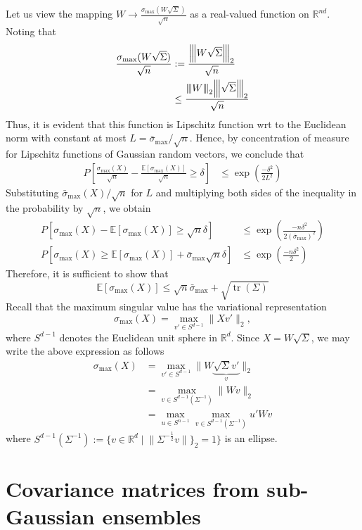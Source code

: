 \documentclass[10pt,handout,english]{beamer}
\DeclareMathOperator{\tr}{tr}
\newcommand{\E}{\mathbb{E}}
\newcommand{\R}{\mathbb{R}}
\newcommand{\vertiii}[1]{{\left\vert\kern-0.25ex\left\vert\kern-0.25ex\left\vert #1 
    \right\vert\kern-0.25ex\right\vert\kern-0.25ex\right\vert}}
\begin{document}
\begin{frame}[allowframebreaks]
Let us view the mapping $W\to\frac{\sigma_{\max}(W\sqrt{\Sigma})}{\sqrt{n}}$ as a real-valued function on $\R^{nd}$. Noting that
\begin{align*}
\frac{\sigma_{\max}(W\sqrt{\Sigma})}{\sqrt{n}}&:= \frac{\vertiii{W\sqrt{\Sigma} }_2}{\sqrt{n}}\\
&\leq\frac{\vertiii{W}_2\vertiii{\sqrt{\Sigma}}_2}{\sqrt{n}}
\end{align*}
Thus, it is evident that this function is Lipschitz function wrt to the Euclidean norm with constant at most $L=\bar{\sigma}_{\max}/\sqrt{n}$. Hence, by concentration of measure for Lipschitz functions of Gaussian random vectors, we conclude that
\begin{align*}
P\left[\frac{\sigma_{\max}(X)}{\sqrt{n}}-\frac{\E[\sigma_{\max}(X)]}{\sqrt{n}} \geq \delta\right]&\leq\exp\left(\frac{-\delta^2}{2L^2}\right)
\end{align*}
Substituting $\bar{\sigma}_{\max}(X)/\sqrt{n}$ for $L$ and multiplying both sides of the inequality in the probability by $\sqrt{n}$, we obtain
\begin{align*}
P[\sigma_{\max}(X)-\E[\sigma_{\max}(X)] \geq \sqrt{n}\delta]&\leq\exp\left(\frac{-n\delta^2 }{2(\bar{\sigma}_{\max})^2}\right)\\
P[\sigma_{\max}(X)\geq\E[\sigma_{\max}(X)] +\bar{\sigma}_{\max} \sqrt{n}\delta]&\leq\exp\left(\frac{-n\delta^2 }{2}\right)
\end{align*}
Therefore, it is sufficient to show that 
\[
\E[\sigma_{\max}(X)]\leq\sqrt{n}\bar{\sigma}_{\max}+\sqrt{\tr(\Sigma)}
\]
Recall that the maximum singular value has the variational representation
\[
\sigma_{\max}(X)=\max_{v'\in S^{d-1}}\lVert Xv'\rVert_2,
\]
where $S^{d-1}$ denotes the Euclidean unit sphere in $\R^d$. Since $X=W\sqrt{\Sigma}$, we may write the above expression as follows
\begin{align*}
\sigma_{\max}(X)&=\max_{v'\in S^{d-1}}\lVert W\underbrace{\sqrt{\Sigma}v'}_{v}\rVert_2\\
&=\max_{v\in S^{d-1}(\Sigma^{-1})}\lVert Wv\rVert_2\\
&=\max_{u\in S^{n-1}}\max_{v\in S^{d-1}(\Sigma^{-1})}u'Wv
\end{align*}
where $S^{d-1}(\Sigma^{-1}):=\{v\in\R^d\mid\lVert\Sigma^{-\frac{1}{2}}v\rVert\}_2=1\}$ is an ellipse. 
\end{frame}
\section{Covariance matrices from sub-Gaussian ensembles}
\frame{\tableofcontents[currentsection]}
\end{document}
